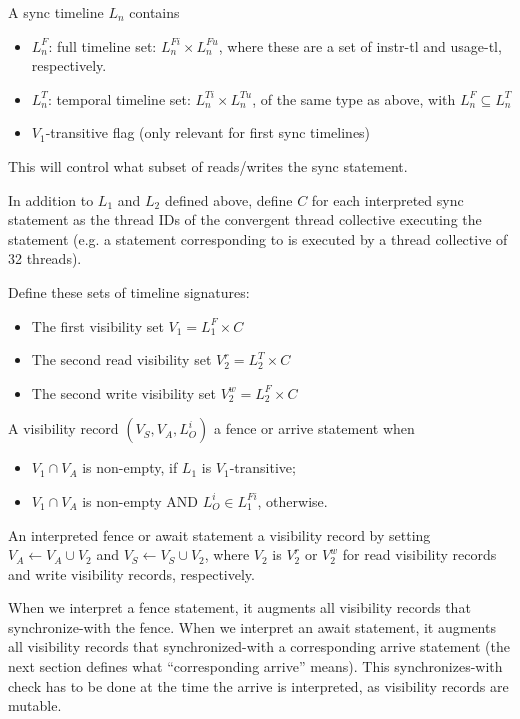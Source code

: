 A sync timeline $L_n$ contains
\begin{itemize}
  \item $L_n^F$: full timeline set: $L_n^{Fi} \times L_n^{Fu}$, where these are a set of instr-tl and usage-tl, respectively.
  \filbreak
  \item $L_n^T$: temporal timeline set: $L_n^{Ti} \times L_n^{Tu}$, of the same type as above, with $L_n^F \subseteq L_n^T$
  \filbreak
  \item $V_1$-transitive flag (only relevant for first sync timelines)
\end{itemize}
\filbreak
This will control what subset of reads/writes  the sync statement.

\filbreak
{}

In addition to $L_1$ and $L_2$ defined above, define $C$ for each interpreted sync statement as the thread IDs of the convergent thread collective executing the statement (e.g. a statement corresponding to  is executed by a thread collective of 32 threads).

\filbreak
Define these sets of timeline signatures:
\begin{itemize}
  \item The first visibility set $V_1 = L_1^F \times C$
  \item The second read visibility set $V_2^r = L_2^T \times C$
  \item The second write visibility set $V_2^w = L_2^F \times C$
\end{itemize}

\filbreak
A visibility record $(V_S, V_A, L_O^i)$  a fence or arrive statement when
\begin{itemize}
  \item $V_1 \cap V_A$ is non-empty, if $L_1$ is $V_1$-transitive;
  \filbreak
  \item $V_1 \cap V_A$ is non-empty AND $L_O^i \in L_1^{Fi}$, otherwise.
\end{itemize}
\filbreak

\filbreak
An interpreted fence or await statement  a visibility record by setting $V_A \leftarrow V_A \cup V_2$ and $V_S \leftarrow V_S \cup V_2$, where $V_2$ is $V_2^r$ or $V_2^w$ for read visibility records and write visibility records, respectively.

\filbreak
When we interpret a fence statement, it augments all visibility records that synchronize-with the fence.
When we interpret an await statement, it augments all visibility records that synchronized-with a corresponding arrive statement
(the next section defines what ``corresponding arrive'' means).
This synchronizes-with check has to be done at the time the arrive is interpreted, as visibility records are mutable.

